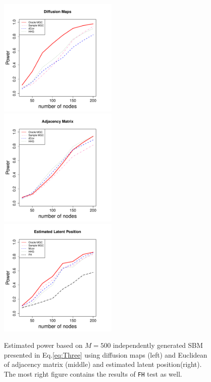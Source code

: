 \documentclass[12pt]{article}
\theoremstyle{definition}
\begin{document}
\begin{figure}[H]
	\centering
	\includegraphics[width=2.3in]{../Figure/ThreeSBM.pdf}
	\includegraphics[width=2.3in]{../Figure/EThreeSBM.pdf}
	\includegraphics[width =2.3in]{../Figure/fThreeSBM.pdf}
	\caption{Estimated power based on $M = 500$ independently generated SBM presented in Eq.\ref{eq:Three} using diffusion maps (left) and Euclidean of adjacency matrix (middle)  and estimated latent position(right). The most right figure contains the results of \texttt{FH} test as well.}
	\label{fig:Three}
\end{figure}	
\end{document}
